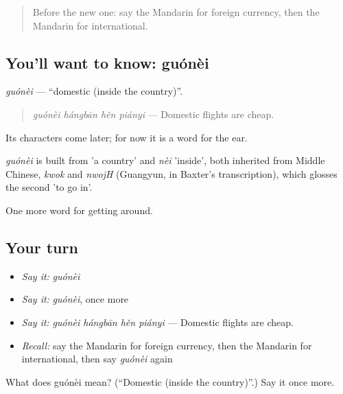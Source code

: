 \label{lesson:ZH-C419-guonei}



\begin{quote}
Before the new one: say the Mandarin for foreign currency, then the Mandarin for international.
\end{quote}

\subsection*{You'll want to know: guónèi}
\emph{guónèi} — \textquotedblleft{}domestic (inside the country)\textquotedblright{}.

\begin{quote}
\emph{guónèi hángbān hěn piányi} — Domestic flights are cheap.
\end{quote}

Its characters come later; for now it is a word for the ear.

\begin{cousinweb}
\emph{guónèi} is built from  'a country' and \emph{nèi} 'inside', both inherited from Middle Chinese, \emph{kwok} and \emph{nwojH} (Guangyun, in Baxter's transcription), which glosses the second 'to go in'.
\end{cousinweb}

\begin{grammarlens}[title={What you've built}]
One more word for getting around.
\end{grammarlens}

\subsection*{Your turn}
\begin{itemize}
\raggedright
  \item \emph{Say it:} \emph{guónèi}
  \item \emph{Say it:} \emph{guónèi}, once more
  \item \emph{Say it:} \emph{guónèi hángbān hěn piányi} — Domestic flights are cheap.
  \item \emph{Recall:} say the Mandarin for foreign currency, then the Mandarin for international, then say \emph{guónèi} again
\end{itemize}

\begin{tcolorbox}[breakable,colback=teal!4,colframe=teal!35!black,title={Before you move on}]
What does guónèi mean? (\textquotedblleft{}Domestic (inside the country)\textquotedblright{}.) Say it once more.
\end{tcolorbox}
